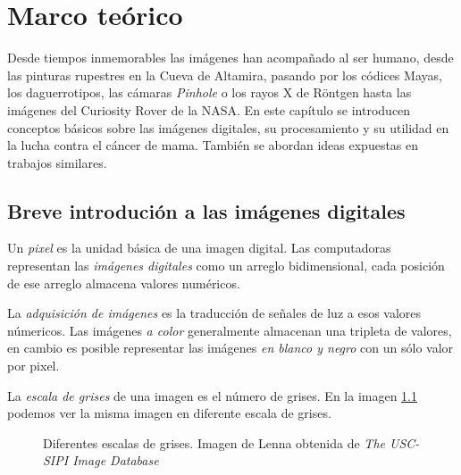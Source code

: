 \chapter{Marco teórico}
\label{marco}

Desde tiempos inmemorables las imágenes han acompañado al ser humano, desde las
pinturas rupestres en la Cueva de Altamira, pasando por los códices Mayas, los
daguerrotipos, las cámaras \textit{Pinhole} o los rayos X de Röntgen hasta las
imágenes del Curiosity Rover de la NASA. En este capítulo se introducen
conceptos básicos sobre las imágenes digitales, su procesamiento y su utilidad
en la lucha contra el cáncer de mama. También se abordan ideas expuestas en
trabajos similares.

\section{Breve introdución a las imágenes digitales}

Un \textit{pixel} es la unidad básica de una imagen digital. Las computadoras
representan las \textit{imágenes digitales} como un arreglo bidimensional, cada
posición de ese arreglo almacena valores numéricos. 


La \textit{adquisición de imágenes} es la traducción de señales de luz a esos
valores númericos. Las imágenes \textit{a color} generalmente almacenan una
tripleta de valores, en cambio es posible representar las imágenes \textit{en
blanco y negro} con un sólo valor por pixel.

La \textit{escala de grises} de una imagen es el número de grises. En la imagen
\ref{grayscales} podemos ver la misma imagen en diferente escala de grises.


\begin{figure}[h]
    \centering


    \bigskip


  \caption{Diferentes escalas de grises. Imagen de Lenna obtenida de
  \textit{The USC-SIPI Image Database}}
  
  \label{grayscales}
\end{figure}

